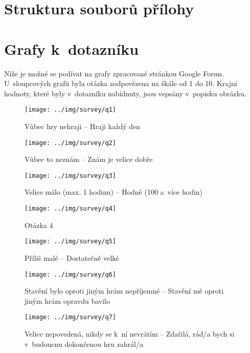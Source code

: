 

\appendix
{}

\renewcommand{\thesection}{\Alph{section}}

\section{Struktura souborů přílohy}


\section{Grafy k~dotazníku}
\label{sec:survey}


Níže je možné se podívat na grafy zpracované stránkou Google Forms. U~sloupcových grafů byla otázka zodpovězena na škále od 1 do 10. Krajní hodnoty, které byly v~dotazníku nabídnuty, jsou vepsány v~popisku obrázku.

\begin{figure}[!ht]\centering
\texttt{[image: ../img/survey/q1]}
\caption{Vůbec hry nehraji -- Hraji každý den}
\label{fig:q1}
\end{figure}
\FloatBarrier


\begin{figure}[!ht]\centering
\texttt{[image: ../img/survey/q2]}
\caption{Vůbec to neznám -- Znám je velice dobře}
\label{fig:q2}
\end{figure}
\FloatBarrier


\begin{figure}[!ht]\centering
\texttt{[image: ../img/survey/q3]}
\caption{Velice málo (max. 1 hodinu) -- Hodně (100 a~více hodin)}
\label{fig:q3}
\end{figure}
\FloatBarrier


\begin{figure}[!ht]\centering
\texttt{[image: ../img/survey/q4]}
\caption{Otázka 4}
\label{fig:q4}
\end{figure}
\FloatBarrier


\begin{figure}[!ht]\centering
\texttt{[image: ../img/survey/q5]}
\caption{Příliš malé -- Dostatečně velké}
\label{fig:q5}
\end{figure}
\FloatBarrier


\begin{figure}[!ht]\centering
\texttt{[image: ../img/survey/q6]}
\caption{Stavění bylo oproti jiným hrám nepříjemné -- Stavění mě oproti jiným hrám opravdu bavilo}
\label{fig:q6}
\end{figure}
\FloatBarrier


\begin{figure}[!ht]\centering
\texttt{[image: ../img/survey/q7]}
\caption{Velice nepovedená, nikdy se k~ní nevrátím -- Zdařilá, rád/a bych si v~budoucnu dokončenou hru zahrál/a}
\label{fig:q7}
\end{figure}
\FloatBarrier